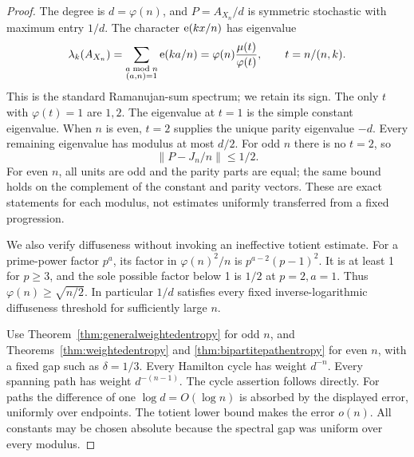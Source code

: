 \begin{proof}
The degree is \(d=\varphi(n)\), and \(P=A_{X_n}/d\) is symmetric
stochastic with maximum entry \(1/d\).
The character \(\mathrm e(kx/n)\) has eigenvalue
\[
 \lambda_k(A_{X_n})
   =\sum_{\substack{a\bmod n\\(a,n)=1}}\mathrm e(ka/n)
   =\varphi(n)\frac{\mu(t)}{\varphi(t)},
       \qquad t=n/(n,k).
\]
This is the standard Ramanujan-sum spectrum; we retain its sign.
The only \(t\) with \(\varphi(t)=1\) are \(1,2\).
The eigenvalue at \(t=1\) is the simple constant eigenvalue.
When \(n\) is even, \(t=2\) supplies the unique parity
eigenvalue \(-d\).
Every remaining eigenvalue has modulus at most \(d/2\).
For odd \(n\) there is no \(t=2\), so
\[
 \|P-J_n/n\|\leq1/2.
\]
For even \(n\), all units are odd and the parity parts are equal;
the same bound holds on the complement of the constant
and parity vectors.
These are exact statements for each modulus, not estimates
uniformly transferred from a fixed progression.

We also verify diffuseness without invoking an ineffective
totient estimate.
For a prime-power factor \(p^a\), its factor in
\(\varphi(n)^2/n\) is \(p^{a-2}(p-1)^2\).
It is at least 1 for \(p\geq3\), and the sole possible factor
below 1 is \(1/2\) at \(p=2,a=1\).
Thus \(\varphi(n)\geq\sqrt{n/2}\).
In particular \(1/d\) satisfies every fixed inverse-logarithmic
diffuseness threshold for sufficiently large \(n\).

Use Theorem~\ref{thm:generalweightedentropy} for odd \(n\), and
Theorems~\ref{thm:weightedentropy} and
\ref{thm:bipartitepathentropy} for even \(n\), with a fixed
gap such as \(\delta=1/3\).
Every Hamilton cycle has weight \(d^{-n}\).
Every spanning path has weight \(d^{-(n-1)}\).
The cycle assertion follows directly.
For paths the difference of one \(\log d=O(\log n)\) is
absorbed by the displayed error, uniformly over endpoints.
The totient lower bound makes the error \(o(n)\).
All constants may be chosen absolute because the spectral
gap was uniform over every modulus.
\end{proof}

